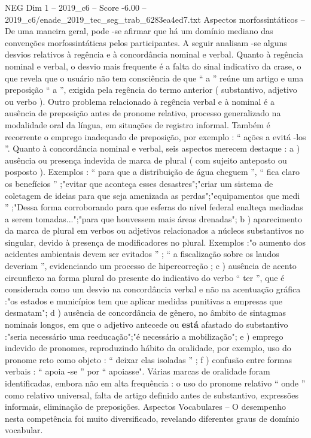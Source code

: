 \begin{textsample}{NEG Dim 1 – 2019\_c6 – Score -6.00 – 2019\_c6/enade\_2019\_tec\_seg\_trab\_6283ea4ed7.txt}
Aspectos morfossintáticos – De uma maneira geral, pode -se afirmar que há um domínio mediano das convenções morfossintáticas pelos participantes.
A seguir analisam -se alguns desvios relativos à regência e à concordância nominal e verbal.
Quanto à regência nominal e verbal, o desvio mais frequente é a falta do sinal indicativo da crase, o que revela que o usuário não tem consciência de que “ a ” reúne um artigo e uma preposição “ a ”, exigida pela regência do termo anterior ( substantivo, adjetivo ou verbo ).
Outro problema relacionado à regência verbal e à nominal é a ausência de preposição antes de pronome relativo, processo generalizado na modalidade oral da língua, em situações de registro informal.
Também é recorrente o emprego inadequado de preposição, por exemplo : “ ações a evitá -los ”.
Quanto à concordância nominal e verbal, seis aspectos merecem destaque : a ) ausência ou presença indevida de marca de plural ( com sujeito anteposto ou posposto ).
Exemplos : “ para que a distribuição de água cheguem ”, “ fica claro os benefícios ” ;"evitar que aconteça esses desastres";"criar um sistema de coletagem de ideias para que seja amenizada as perdas";"equipamentos que medi ” ;"Dessa forma corroborando para que esferas do nível federal enalteça mediadas a serem tomadas...";"para que houvessem mais áreas drenadas"; b ) aparecimento da marca de plural em verbos ou adjetivos relacionados a núcleos substantivos no singular, devido à presença de modificadores no plural.
Exemplos :"o aumento dos acidentes ambientais devem ser evitados ” ; “ a fiscalização sobre os laudos deveriam ”, evidenciando um processo de hipercorreção ; c ) ausência de acento circunflexo na forma plural do presente do indicativo do verbo “ ter ”, que é considerada como um desvio na concordância verbal e não na acentuação gráfica :"os estados e municípios tem que aplicar medidas punitivas a empresas que desmatam"; d ) ausência de concordância de gênero, no âmbito de sintagmas nominais longos, em que o adjetivo antecede ou \textbf{está} afastado do substantivo :"seria necessário uma reeducação";"é necessário a mobilização"; e ) emprego indevido de pronomes, reproduzindo hábito da oralidade, por exemplo, uso do pronome reto como objeto : “ deixar elas isoladas ” ; f ) confusão entre formas verbais : “ apoia -se ” por “ apoiasse".
Várias marcas de oralidade foram identificadas, embora não em alta frequência : o uso do pronome relativo “ onde ” como relativo universal, falta de artigo definido antes de substantivo, expressões informais, eliminação de preposições.
Aspectos Vocabulares – O desempenho nesta competência foi muito diversificado, revelando diferentes graus de domínio vocabular.

\end{textsample}
